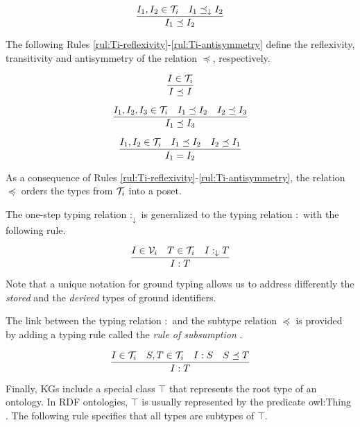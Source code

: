 \documentclass[runningheads]{llncs}
\newcommand{\darr}{\downarrow}
\newcommand{\V}{{\cal V}}
\newcommand{\T}{{\cal T}}
\begin{document}
\begin{equation}
\label{rul:Ic-extended}
\dfrac{I_1,I_2\in\T_i \quad I_1\preceq_\darr\/I_2}
      {I_1 \preceq I_2}
\end{equation}

The following Rules \ref{rul:Ti-reflexivity}-\ref{rul:Ti-antisymmetry}
define the reflexivity, transitivity and antisymmetry of the
relation $\preceq$, respectively.

\begin{equation}
\label{rul:Ti-reflexivity}
\dfrac{I\in\T_i}
      {I\preceq\/I}
\end{equation}

\begin{equation}
\label{rul:Ti-transitivity}
\dfrac{I_1,I_2,I_3\in\T_i\quad\/I_1\preceq\/I_2\quad\/I_2\preceq\/I_3}
      {I_1\preceq\/I_3}   
\end{equation}

\begin{equation}
\label{rul:Ti-antisymmetry}
\dfrac{I_1,I_2\in\T_i \quad I_1\preceq\/I_2 \quad I_2\preceq\/I_1}
      {I_1=I_2}   
\end{equation}

\noindent
As a consequence of Rules
\ref{rul:Ti-reflexivity}-\ref{rul:Ti-antisymmetry}, the relation
$\preceq$ orders the types from $\T_i$ into a poset.

The one-step typing relation $:_\darr$ is generalized to the typing
relation $:$ with the following rule.

\begin{equation}
\dfrac{I\in\V_i\quad\/T\in\T_i\quad\/I:_\darr\/T}
      {I:T}
\end{equation}

Note that a unique notation for ground typing allows us to address
differently the \emph{stored} and the \emph{derived} types of ground
identifiers.

The link between the typing relation $:$ and the subtype relation
$\preceq$ is provided by adding a typing rule called the \emph{rule of
  subsumption} \cite{Pierce2002}.

\begin{equation}
\label{rul:typing-subsumption}
\dfrac{I\in\T_i\quad\/S,T\in\T_i\quad\/I:S\quad\/S\preceq\/T}
      {I:T}    
\end{equation}

Finally, KGs include a special class $\top$ that represents the root
type of an ontology. In RDF ontologies, $\top$ is usually represented
by the predicate owl:Thing \cite{Hoffart2013}. The following rule
specifies that all types are subtypes of $\top$.
\end{document}
